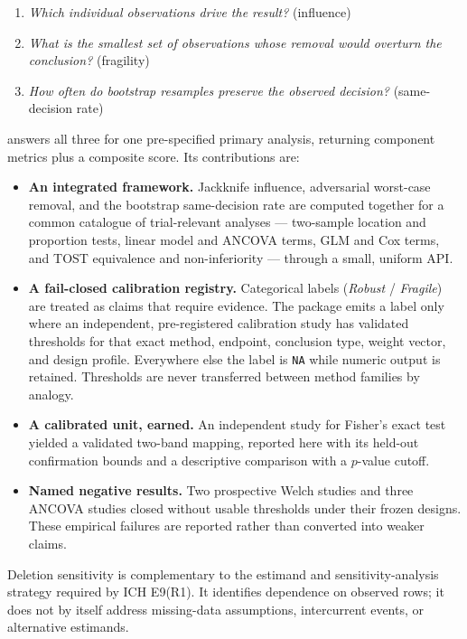 \begin{enumerate}
\def\labelenumi{\arabic{enumi}.}
\tightlist
\item
  \emph{Which individual observations drive the result?} (influence)
\item
  \emph{What is the smallest set of observations whose removal would overturn the
  conclusion?} (fragility)
\item
  \emph{How often do bootstrap resamples preserve the observed decision?}
  (same-decision rate)
\end{enumerate}

 \citep{ally2026stabilitest} answers all three for one
pre-specified primary analysis, returning component metrics plus a composite
score. Its contributions are:

\begin{itemize}
\tightlist
\item
  \textbf{An integrated framework.} Jackknife influence, adversarial worst-case
  removal, and the bootstrap same-decision rate are computed together for a common
  catalogue of trial-relevant analyses --- two-sample location and proportion
  tests, linear model and ANCOVA terms, GLM and Cox terms, and TOST
  equivalence and non-inferiority --- through a small, uniform API.
\item
  \textbf{A fail-closed calibration registry.} Categorical labels
  (\emph{Robust} / \emph{Fragile}) are treated as claims that require evidence. The
  package emits a label only where an independent, pre-registered calibration
  study has validated thresholds for that exact method, endpoint, conclusion
  type, weight vector, and design profile. Everywhere else the label is \texttt{NA}
  while numeric output is retained. Thresholds are never transferred between
  method families by analogy.
\item
  \textbf{A calibrated unit, earned.} An independent study for Fisher's exact test
  yielded a validated two-band mapping, reported here with its held-out
  confirmation bounds and a descriptive comparison with a \(p\)-value cutoff.
\item
  \textbf{Named negative results.} Two prospective Welch studies and three ANCOVA
  studies closed without usable thresholds under their frozen designs. These
  empirical failures are reported rather than converted into weaker claims.
\end{itemize}

Deletion sensitivity is complementary to the estimand and sensitivity-analysis
strategy required by ICH E9(R1). It identifies dependence on observed rows; it
does not by itself address missing-data assumptions, intercurrent events, or
alternative estimands.

